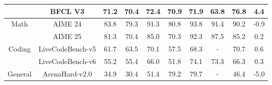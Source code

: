 \documentclass{article} %
\begin{document}
\begin{table}[h]
{\begin{tabular}{@{}cccccccccc@{}}
                          & BFCL V3          & 71.2                                                              & 70.4      & 72.4                                                          & 70.9                                                                & 71.9                                                               & 63.8                                                        & 76.8    & 4.4   \\ \midrule
\multirow{2}{*}{Math}     & AIME 24          & 83.8                                                              & 79.3      & 91.3                                                          & 80.8                                                                & 93.8                                                               & 91.4                                                        & 90.2    & -0.9  \\
                          & AIME 25          & 81.3                                                              & 70.4      & 85.0                                                          & 70.3                                                                & 92.3                                                               & 87.5                                                        & 85.2    & 0.2   \\ \midrule
\multirow{2}{*}{Coding}   & LiveCodeBench-v5 & 61.7                                                              & 63.5      & 70.1                                                          & 57.5                                                                & 68.3                                                               & -                                                           & 70.7    & 0.6   \\
                          & LiveCodeBench-v6 & 55.2                                                              & 55.4      & 66.0                                                          & 51.8                                                                & 74.1                                                               & 73.3                                                        & 66.3    & 0.3   \\ \midrule
\multirow{4}{*}{General}  & ArenaHard-v2.0   & 34.9                                                              & 30.4      & 51.4                                                          & 79.2                                                                & 79.7                                                               & -                                                           & 46.4    & -5.0  \\

\end{tabular}}
\end{table}
\end{document}
